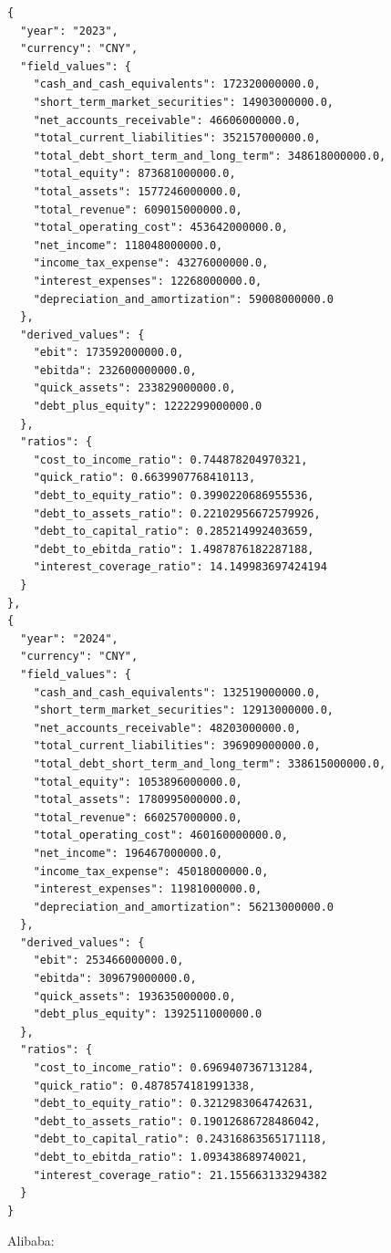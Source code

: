 \documentclass[12pt,a4paper]{article}
\begin{document}
\begin{lstlisting}[style=json, caption={Calculated financial ratios for Tencent (FY\,2023--2024)}, label=lst:ratios_tencent]
{
  "year": "2023",
  "currency": "CNY",
  "field_values": {
    "cash_and_cash_equivalents": 172320000000.0,
    "short_term_market_securities": 14903000000.0,
    "net_accounts_receivable": 46606000000.0,
    "total_current_liabilities": 352157000000.0,
    "total_debt_short_term_and_long_term": 348618000000.0,
    "total_equity": 873681000000.0,
    "total_assets": 1577246000000.0,
    "total_revenue": 609015000000.0,
    "total_operating_cost": 453642000000.0,
    "net_income": 118048000000.0,
    "income_tax_expense": 43276000000.0,
    "interest_expenses": 12268000000.0,
    "depreciation_and_amortization": 59008000000.0
  },
  "derived_values": {
    "ebit": 173592000000.0,
    "ebitda": 232600000000.0,
    "quick_assets": 233829000000.0,
    "debt_plus_equity": 1222299000000.0
  },
  "ratios": {
    "cost_to_income_ratio": 0.744878204970321,
    "quick_ratio": 0.6639907768410113,
    "debt_to_equity_ratio": 0.3990220686955536,
    "debt_to_assets_ratio": 0.22102956672579926,
    "debt_to_capital_ratio": 0.285214992403659,
    "debt_to_ebitda_ratio": 1.4987876182287188,
    "interest_coverage_ratio": 14.149983697424194
  }
},
{
  "year": "2024",
  "currency": "CNY",
  "field_values": {
    "cash_and_cash_equivalents": 132519000000.0,
    "short_term_market_securities": 12913000000.0,
    "net_accounts_receivable": 48203000000.0,
    "total_current_liabilities": 396909000000.0,
    "total_debt_short_term_and_long_term": 338615000000.0,
    "total_equity": 1053896000000.0,
    "total_assets": 1780995000000.0,
    "total_revenue": 660257000000.0,
    "total_operating_cost": 460160000000.0,
    "net_income": 196467000000.0,
    "income_tax_expense": 45018000000.0,
    "interest_expenses": 11981000000.0,
    "depreciation_and_amortization": 56213000000.0
  },
  "derived_values": {
    "ebit": 253466000000.0,
    "ebitda": 309679000000.0,
    "quick_assets": 193635000000.0,
    "debt_plus_equity": 1392511000000.0
  },
  "ratios": {
    "cost_to_income_ratio": 0.6969407367131284,
    "quick_ratio": 0.4878574181991338,
    "debt_to_equity_ratio": 0.3212983064742631,
    "debt_to_assets_ratio": 0.19012686728486042,
    "debt_to_capital_ratio": 0.24316863565171118,
    "debt_to_ebitda_ratio": 1.093438689740021,
    "interest_coverage_ratio": 21.155663133294382
  }
}
\end{lstlisting}

Alibaba:
\end{document}

